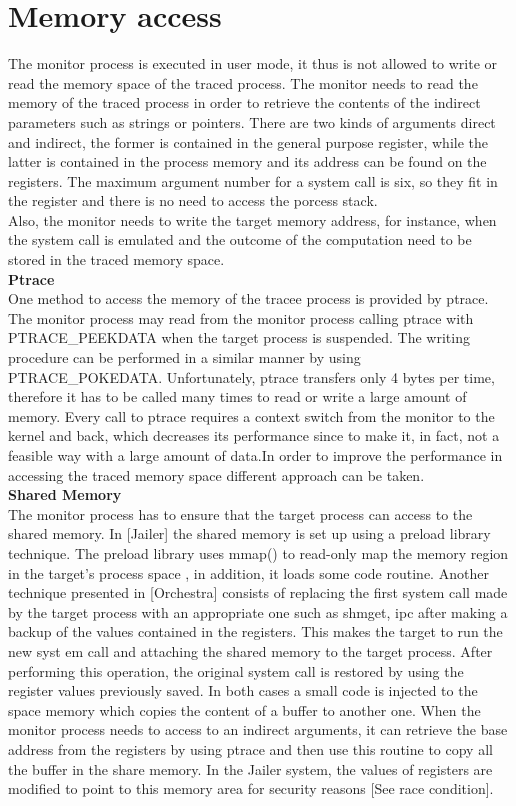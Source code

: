 \section{Memory access}
\label{memory_access}
The monitor process is executed in user mode, it thus is not allowed to write or read the memory space of the traced process. The monitor needs to read the memory of the traced process in order to retrieve the contents of the indirect parameters such as strings or pointers.
There are two kinds of arguments direct and indirect, the former is contained in the general purpose register, while the latter is contained in the process memory and its address can be found on the registers. The maximum argument number for a system call is six, so they fit in the register and there is no need to access the porcess stack.\\ Also, the monitor needs to write the target memory address, for instance, when the system call is emulated and the outcome of the computation need to be stored in the traced memory space.\\
\textbf{Ptrace}\\
One method to access the memory of the tracee process is provided by ptrace. The monitor process may read from the monitor process calling ptrace with PTRACE\_PEEKDATA when the target process is suspended. The writing procedure can be performed in a similar manner by using PTRACE\_POKEDATA. Unfortunately, ptrace transfers only 4 bytes per time, therefore it has to be called many times to read or write a large amount of memory. Every call to ptrace requires a context switch from the monitor to the kernel and back, which decreases its performance since to make it, in fact, not a feasible way with a large amount of data.In order to improve the performance in accessing the traced memory space different approach can be taken.\\
\textbf{Shared Memory}\\
The monitor process has to ensure that the target process can access to the shared memory. In [Jailer] the shared memory is set up using a preload library technique. The preload library uses mmap() to read-only map the memory region in the target’s process space , in addition, it loads some code routine. Another technique presented in [Orchestra] consists of replacing the first system call made by the target process with an appropriate one such as shmget, ipc after making a backup of the values contained in the registers.   This makes the target to run the new syst em call and attaching the shared memory to the target process. After performing this operation, the original system call is restored by using the register values previously saved.  In both cases a small code is injected to the space memory which copies the content of a buffer to another one. When the monitor process needs to access to an indirect arguments, it can retrieve the base address from the registers by using ptrace and then use this routine to copy all the buffer in the share memory. In the Jailer system, the values of registers are modified to point to this memory area for security reasons [See race condition].\\
